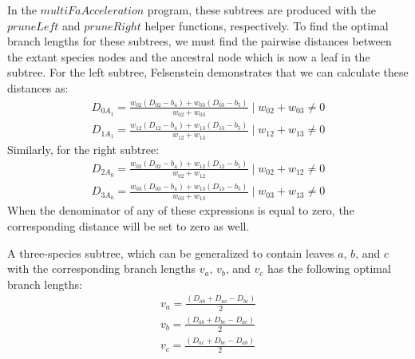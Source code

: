 \documentclass{article} %
\begin{document}
In the $multiFaAcceleration$ program, these subtrees are produced with the $pruneLeft$ and $pruneRight$ helper functions, respectively. To find the optimal branch lengths for these subtrees, we must find the pairwise distances between the extant species nodes and the ancestral node which is now a leaf in the subtree. For the left subtree, Felsenstein demonstrates that we can calculate these distances as:
\begin{equation*}
\begin{split}
	D_{0A_1} = \frac{w_{02}(D_{02} - b_4) + w_{03}(D_{03} - b_5)}{w_{02} + w_{03}} \mid w_{02} + w_{03} \ne 0 \\
	D_{1A_1} = \frac{w_{12}(D_{12} - b_4) + w_{13}(D_{13} - b_5)}{w_{12} + w_{13}} \mid w_{12} + w_{13} \ne 0
\end{split}
\end{equation*}
Similarly, for the right subtree:
\begin{equation*}
\begin{split}
	D_{2A_0} = \frac{w_{02}(D_{02} - b_4) + w_{12}(D_{12} - b_5)}{w_{02} + w_{12}} \mid w_{02} + w_{12} \ne 0\\
	D_{3A_0} = \frac{w_{03}(D_{03} - b_4) + w_{13}(D_{13} - b_5)}{w_{03} + w_{13}} \mid w_{03} + w_{13} \ne 0
\end{split}
\end{equation*}
When the denominator of any of these expressions is equal to zero, the corresponding distance will be set to zero as well.\par
A three-species subtree, which can be generalized to contain leaves $a$, $b$, and $c$ with the corresponding branch lengths $v_a$, $v_b$, and $v_c$ has the following optimal branch lengths:
\begin{equation*}
\begin{split}
v_a = \frac{(D_{ab} + D_{ac} - D_{bc})}{2}\\
v_b = \frac{(D_{ab} + D_{bc} - D_{ac})}{2}\\
v_c = \frac{(D_{ac} + D_{bc} - D_{ab})}{2}
\end{split}
\end{equation*}
\end{document}
